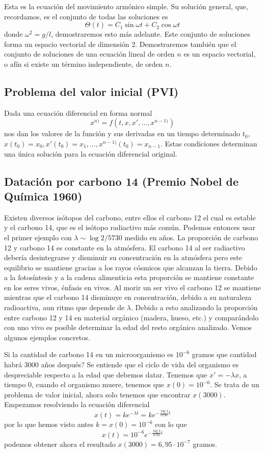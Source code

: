\documentclass[../main.tex]{subfiles}
\begin{document}
Esta es la ecuación del movimiento armónico simple. Su solución general, que, 
recordamos, es el conjunto de todas las soluciones es
\[\Theta(t) = C_1 \sin \omega t + C_2 \cos \omega t\]
donde \(\omega^2 = g/l\), demostraremos esto más adelante. Este conjunto de
soluciones forma un espacio vectorial de dimensión 2. Demostraremos también que
el conjunto de soluciones de una ecuación lineal de orden \(n\) es un espacio
vectorial, o afín si existe un término independiente, de orden \(n\).

\subsection{Problema del valor inicial (PVI)}

Dada una ecuación diferencial en forma normal
\[x^{n)} = f(t, x, x', \dots, x^{n - 1)})\]
nos dan los valores de la función y sus derivadas en un tiempo determinado
\(t_0\), \(x(t_0) = x_0, x'(t_0) = x_1, \dots, x^{n - 1)}(t_0) = x_{n - 1}\).
Estas condiciones determinan una única solución para la ecuación diferencial
original.

\subsection{Datación por carbono 14 (Premio Nobel de Química 1960)}

Existen diversos isótopos del carbono, entre ellos el carbono 12 el cual es
estable y el carbono 14, que es el isótopo radiactivo más común. Podemos
entonces usar el primer ejemplo con \(\lambda \sim \log 2 / 5730\) medido en
años. La proporción de carbono 12 y carbono 14 es constante en la atmósfera. El
carbono 14 al ser radiactivo debería desintegrarse y disminuir su concentración
en la atmósfera pero este equilibrio se mantiene gracias a los rayos cósmicos
que alcanzan la tierra. Debido a la fotosíntesis y a la cadena alimenticia esta
proporción se mantiene constante en los seres vivos, énfasis en vivos. Al morir
un ser vivo el carbono 12 se mantiene mientras que el carbono 14 disminuye en
concentración, debido a su naturaleza radioactiva, aun ritmo que depende de
\(\lambda\). Debido a esto analizando la proporción entre carbono 12 y 14 en
material orgánico (madera, hueso, etc.) y comparándolo con uno vivo es posible
determinar la edad del resto orgánico analizado. Vemos algunos ejemplos
concretos.

Si la cantidad de carbono 14 en un microorganismo es \(10^{-6}\) gramos que
cantidad habrá 3000 años después? Se entiende que el ciclo de vida del organismo
es despreciable respecto a la edad que debemos datar. Tenemos que 
\(x' = -\lambda x\), a tiempo \(0\), cuando el organismo muere, tenemos que
\(x(0) = 10^{-6}\). Se trata de un problema de valor inicial, ahora solo tenemos
que encontrar \(x(3000)\). Empezamos resolviendo la ecuación diferencial
\[x(t) = k e^{-\lambda t} = k e^{-\frac{\log 2}{5730} t}\]
por lo que hemos visto antes \(k = x(0) = 10^{-6}\) con lo que
\[x(t) = 10^{-6} e^{-\frac{\log 2}{5730} t}\]
podemos obtener ahora el resultado \(x(3000) = 6,95 \cdot 10^{-7}\) gramos.
\end{document}
